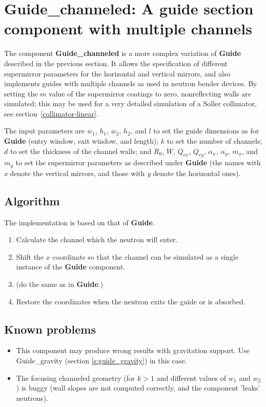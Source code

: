 \newpage

\section{Guide\_channeled: A guide section component with multiple channels}
\label{s:channeled_guide}


The component {\bf Guide\_channeled} is a more complex variation of {\bf Guide}
described in the previous section. It allows the specification
of different supermirror parameters for the horizontal and vertical
mirrors, and also implements guides with multiple channels as used in
neutron bender devices. By setting the $m$ value of the supermirror
coatings to zero, nonreflecting walls are simulated;
this may be used for a very detailed simulation of a Soller collimator,
see section~\ref{collimator-linear}.

The input parameters are $w_1$, $h_1$, $w_2$, $h_2$, and $l$
to set the guide dimensions as for {\bf Guide}
(entry window, exit window, and length);
$k$ to set the number of channels; $d$ to set the thickness of the
channel walls; and $R_0$, $W$, $Q_{cx}$, $Q_{cy}$, $\alpha_x$, $\alpha_y$,
$m_x$, and $m_y$ to set the supermirror parameters as described under {\bf Guide}
(the names with \textit{x} denote the vertical mirrors,
and those with \textit{y} denote the horizontal ones).

\subsection{Algorithm}
The implementation is based on that of {\bf Guide}.
\begin{enumerate}
\item Calculate the channel which the neutron will enter.
\item Shift the $x$ coordinate so that the channel can be simulated
as a single instance of the {\bf Guide} component.
\item (do the same as in {\bf Guide}.)
\item Restore the coordinates when the
neutron exits the guide or is absorbed.
\end{enumerate}

\subsection{Known problems}
\begin{itemize}
\item This component may produce wrong results with gravitation support.
Use Guide\_gravity (section \ref{s:guide_gravity}) in this case.
\item The focusing channeled geometry (for $k > 1$ and different
values of $w_1$ and $w_2$) is buggy
(wall slopes are not computed correctly, and the component 'leaks' neutrons).
\end{itemize}
\newpage

